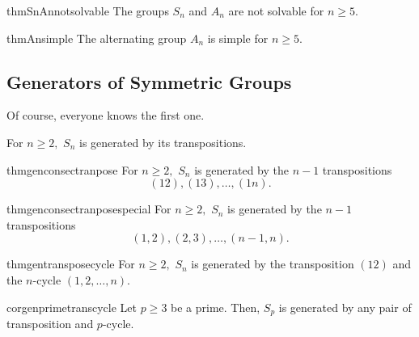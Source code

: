 \begin{restatable}[]{thm}{SnAnnotsolvable}
\label{thm:SnAnnotsolvable}
	The groups $S_n$ and $A_n$ are not solvable for $n \ge 5.$ \hfill\hyperref[thm:SnAnnotsolvable2]{\downsym}
\end{restatable}

\begin{restatable}[]{thm}{Ansimple}
\label{thm:Ansimple}
	The alternating group $A_n$ is simple for $n \ge 5.$ \hfill\hyperref[thm:Ansimple2]{\downsym}
\end{restatable}

\subsection{Generators of Symmetric Groups}

Of course, everyone knows the first one.

\begin{thm} \label{thm:gentranspose}
	For $n \ge 2,$ $S_n$ is generated by its transpositions.
\end{thm}

\begin{restatable}[]{thm}{genconsectranpose}
\label{thm:genconsectranpose}
	For $n \ge 2,$ $S_n$ is generated by the $n - 1$ transpositions
	\begin{equation*} 
		(12), (13), \ldots, (1n).
	\end{equation*} \hfill\hyperref[thm:genconsectranpose2]{\downsym}
\end{restatable}

\begin{restatable}[]{thm}{genconsectranposespecial}
\label{thm:genconsectranposespecial}
	For $n \ge 2,$ $S_n$ is generated by the $n - 1$ transpositions
	\begin{equation*} 
		(1, 2), (2, 3), \ldots, (n - 1, n).
	\end{equation*}  \hfill\hyperref[thm:genconsectranposespecial2]{\downsym}
\end{restatable}

\begin{restatable}[]{thm}{gentransposecycle}
\label{thm:gentransposecycle}
	For $n \ge 2,$ $S_n$ is generated by the transposition $(12)$ and the $n$-cycle $(1, 2, \ldots, n).$ \hfill\hyperref[thm:gentransposecycle2]{\downsym}
\end{restatable}

\begin{restatable}[]{cor}{genprimetranscycle}
\label{cor:genprimetranscycle}
	Let $p \ge 3$ be a prime. Then, $S_p$ is generated by any pair of transposition and $p$-cycle. \hfill\hyperref[cor:genprimetranscycle2]{\downsym}
\end{restatable}

